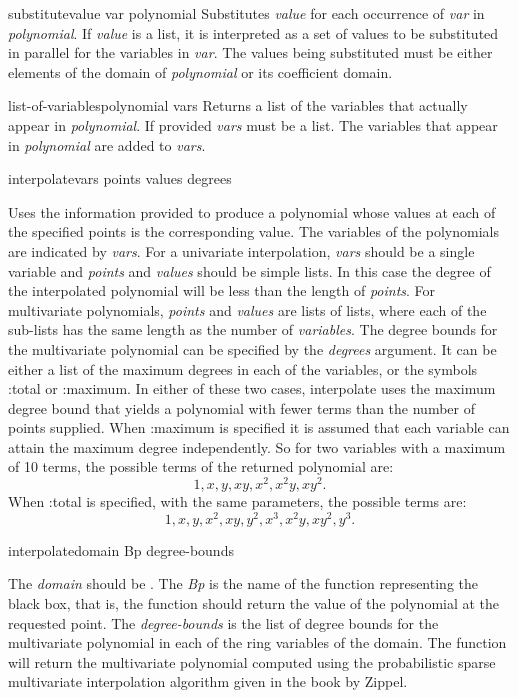 \begin{functiondef}{substitute}{value var polynomial}
Substitutes {\em value} for each occurrence of {\em var} in {\em
polynomial\/}.  If {\em value} is a list, it is interpreted as a set
of values to be substituted in parallel for the variables in {\em
var\/}.  The values being substituted must be either elements of the
domain of {\em polynomial} or its coefficient domain.
\end{functiondef}

\begin{functiondef}{list-of-variables}{polynomial \optional{} vars}
Returns a list of the variables that actually appear in {\em polynomial}.
If provided {\em vars} must be a list.  The variables that appear in
{\em polynomial} are added to {\em vars}.
\end{functiondef}

\begin{functiondef}{interpolate}{vars points values \optional degrees}

Uses the information provided to produce a polynomial
whose values at each of the specified points is the
corresponding value.  The variables of the polynomials
are indicated by {\em vars}.  For a univariate interpolation,
{\em vars} should be a single variable and {\em points} and {\em values}
should be simple lists.  In this case the degree of the
interpolated polynomial will be less than the length
of {\em points}. For multivariate polynomials, {\em points}
and {\em values} are lists of lists, where each of the sub-lists
has the same length as the number of {\em variables}. The
degree bounds for the multivariate polynomial can be
specified by the {\em degrees} argument. It can be either
a list of the maximum degrees in each of the variables,
or the symbols {\sf :total} or {\sf :maximum}.  In either of these
two cases, {\sf interpolate} uses the maximum degree bound
that yields a polynomial with fewer terms than the number
of points supplied. When {\sf :maximum} is specified it is
assumed that each variable can attain the maximum degree
independently. So for two variables with a maximum of
10 terms, the possible terms of the returned polynomial
are:
\[
1, x, y, xy, x^2, x^2 y , x y^2.
\]
When {\sf :total} is specified, with the same parameters, the possible
terms are: 
\[
1, x, y, x^2, xy, y^2, x^3, x^2y, xy^2, y^3.
\]
\end{functiondef}

\begin{functiondef}{interpolate}{domain Bp degree-bounds}

The {\em domain} should be .
The {\em Bp }is the name of the function representing
the black box, that is, the function should return the
value of the polynomial at the requested point. The
{\em degree-bounds} is the list of degree bounds for
the multivariate polynomial in each of the ring variables
of the domain. The function will return the multivariate
polynomial computed using the probabilistic sparse multivariate
interpolation algorithm given in the book by Zippel.
\end{functiondef}

